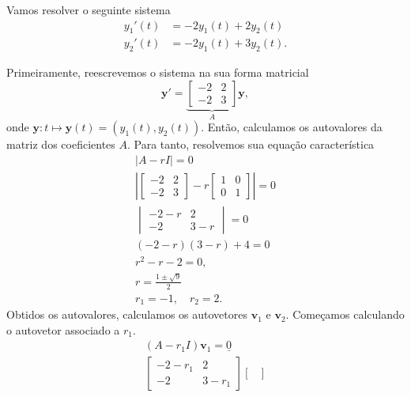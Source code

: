 \begin{ex}\label{ex:edosis1_eqh_avd}
  Vamos resolver o seguinte sistema
  \begin{align}\label{eq:ex_edosis1_eqh_avd}
    y_1'(t) &= -2y_1(t) + 2y_2(t) \\
    y_2'(t) &= -2y_1(t) + 3y_2(t).
  \end{align}

  Primeiramente, reescrevemos o sistema na sua forma matricial
  \begin{equation}
    \pmb{y}' =
    \underbrace{\begin{bmatrix}
        -2 & 2 \\
        -2 & 3
    \end{bmatrix}}_{A}
    \pmb{y},
  \end{equation}
  onde $\pmb{y}: t\mapsto \pmb{y}(t) = (y_1(t), y_2(t))$. Então, calculamos os autovalores da matriz dos coeficientes $A$. Para tanto, resolvemos sua equação característica
  \begin{gather}
    |A-rI| = 0 \\
    \left|
    \begin{bmatrix}
      -2 & 2 \\
      -2 & 3
    \end{bmatrix}
    -r
    \begin{bmatrix}
      1 & 0 \\
      0 & 1
    \end{bmatrix}
    \right| = 0 \\
    \begin{vmatrix}
      -2 - r & 2 \\
      -2 & 3 - r
    \end{vmatrix} = 0 \\
    (-2-r)(3-r) + 4 = 0 \\
    r^2 - r - 2 =  0,\\
    r = \frac{1 \pm \sqrt{9}}{2} \\
    r_1=-1,\quad r_2=2.
  \end{gather}
  Obtidos os autovalores, calculamos os autovetores $\pmb{v}_1$ e $\pmb{v}_2$. Começamos calculando o autovetor associado a $r_1$.
  \begin{gather}
    (A-r_1I)\pmb{v}_1 = \underline{0} \\
    \begin{bmatrix}
      -2-r_1 & 2 \\
      -2 & 3-r_1
    \end{bmatrix}
    \begin{bmatrix}

\end{bmatrix}
\end{gather}
\end{ex}
